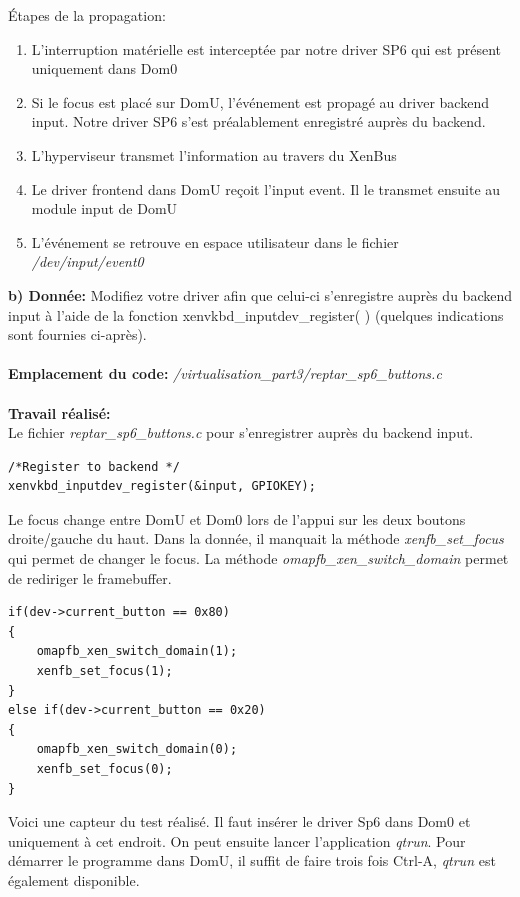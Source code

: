Étapes de la propagation:
\begin{enumerate}
	\item L'interruption matérielle est interceptée par notre driver SP6 qui est présent uniquement dans Dom0
	\item Si le focus est placé sur DomU, l'événement est propagé au driver backend input. Notre driver SP6 s'est préalablement enregistré auprès du backend.
	\item L'hyperviseur transmet l'information au travers du XenBus
	\item Le driver frontend dans DomU reçoit l'input event. Il le transmet ensuite au module input de DomU
	\item L'événement se retrouve en espace utilisateur dans le fichier \textit{/dev/input/event0}
\end{enumerate}
\textbf{b) Donnée: }Modifiez votre driver afin que celui-ci s'enregistre auprès du backend input à l'aide de la fonction
xenvkbd\_inputdev\_register( ) (quelques indications sont fournies ci-après).\\\\
\textbf{Emplacement du code: }\textit{/virtualisation\_part3/reptar\_sp6\_buttons.c}\\\\
\textbf{Travail réalisé: }\\Le fichier \textit{reptar\_sp6\_buttons.c} pour s'enregistrer auprès du backend input.
\begin{lstlisting}
/*Register to backend */
xenvkbd_inputdev_register(&input, GPIOKEY);
\end{lstlisting}
Le focus change entre DomU et Dom0 lors de l'appui sur les deux boutons droite/gauche du haut. Dans la donnée, il manquait la méthode \textit{xenfb\_set\_focus} qui permet de changer le focus. La méthode \textit{omapfb\_xen\_switch\_domain} permet de rediriger le framebuffer.
\begin{lstlisting}
if(dev->current_button == 0x80)
{
	omapfb_xen_switch_domain(1);
	xenfb_set_focus(1);
}
else if(dev->current_button == 0x20)
{
	omapfb_xen_switch_domain(0);
	xenfb_set_focus(0);
}
\end{lstlisting}
Voici une capteur du test réalisé. Il faut insérer le driver Sp6 dans Dom0 et uniquement à cet endroit. On peut ensuite lancer l'application \textit{qtrun}. Pour démarrer le programme dans DomU, il suffit de faire trois fois Ctrl-A, \textit{qtrun} est également disponible.
